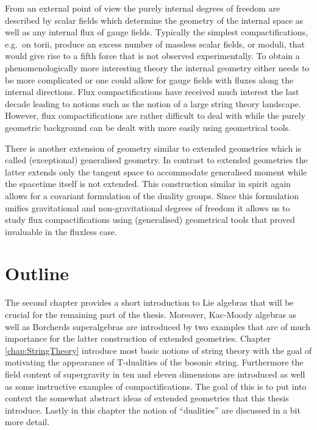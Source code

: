 From an external point of view the purely internal degrees of freedom are described by scalar fields which determine the geometry of the internal space as well as any internal flux of gauge fields. Typically the simplest compactifications, e.g.\ on torii, produce an excess number of massless scalar fields, or moduli, that would give rise to a fifth force that is not observed experimentally. To obtain a phenomenologically more interesting theory the internal geometry either needs to be more complicated or one could allow for gauge fields with fluxes along the internal directions. Flux compactifications have received much interest the last decade leading to notions such as the notion of a large string theory landscape. However, flux compactifications are rather difficult to deal with while the purely geometric background can be dealt with more easily using geometrical tools. 

There is another extension of geometry similar to extended geometries which is called (exceptional) generalised geometry. In contrast to extended geometries the latter extends only the tangent space to accommodate generalised moment while the spacetime itself is not extended. This construction similar in spirit again allows for a covariant formulation of the duality groups. Since this formulation unifies gravitational and non-gravitational degrees of freedom it allows us to study flux compactifications using (generalised) geometrical tools that proved invaluable in the fluxless case.  

\section{Outline}
The second chapter provides a short introduction to Lie algebras that will be crucial for the remaining part of the thesis. Moreover, Kac-Moody algebras as well as Borcherds superalgebras are introduced by two examples that are of much importance for the latter construction of extended geometries. Chapter \ref{chap:StringTheory} introduce most basic notions of string theory with the goal of motivating the appearance of T-dualities of the bosonic string. Furthermore the field content of supergravity in ten and eleven dimensions are introduced as well as some instructive examples of compactifications. The goal of this is to put into context the somewhat abstract ideas of extended geometries that this thesis introduce. Lastly in this chapter the notion of ``dualities'' are discussed in a bit more detail. 

